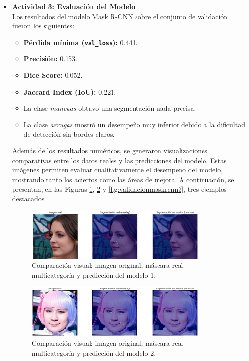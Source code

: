\begin{enumerate}
\begin{itemize}
    \item \textbf{Actividad 3: Evaluación del Modelo} \\
    Los resultados del modelo Mask R-CNN sobre el conjunto de validación fueron los siguientes:
    \begin{itemize}
      \item \textbf{Pérdida mínima (\texttt{val\_loss}):} 0.441.
      \item \textbf{Precisión:} 0.153.
      \item \textbf{Dice Score:} 0.052.
      \item \textbf{Jaccard Index (IoU):} 0.221.
      \item La clase \emph{manchas} obtuvo una segmentación nada precisa.
      \item La clase \emph{arrugas} mostró un desempeño muy inferior debido a la dificultad de detección sin bordes claros.
    \end{itemize}
  
    Además de los resultados numéricos, se generaron visualizaciones comparativas entre los datos reales y las predicciones del modelo. Estas imágenes permiten evaluar cualitativamente el desempeño del modelo, mostrando tanto los aciertos como las áreas de mejora. A continuación, se presentan, en las Figuras \ref{fig:validacionmaskrcnn1}, \ref{fig:validacionmaskrcnn2} y \ref{fig:validacionmaskrcnn3}, tres ejemplos destacados:
  
    \vspace{0.5cm}
  
    \begin{figure}[H]
      \centering
      \includegraphics[width=0.85\textwidth]{4/figures/maskrcnn1.png}
      \caption{Comparación visual: imagen original, máscara real multicategoría y predicción del modelo 1.}
      \label{fig:validacionmaskrcnn1}
    \end{figure}
  
    \begin{figure}[H]
      \centering
      \includegraphics[width=0.85\textwidth]{4/figures/maskrcnn2.png}
      \caption{Comparación visual: imagen original, máscara real multicategoría y predicción del modelo 2.}
      \label{fig:validacionmaskrcnn2}
    \end{figure}
  

\end{itemize}
\end{enumerate}
